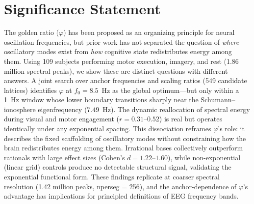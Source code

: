 \documentclass[11pt,a4paper]{article}
\newcommand{\phisym}{\varphi}
\newcommand{\fzero}{f_0}
\begin{document}
\begin{abstract}
Beyond $\phisym$'s individual dominance, irrational bases ($\phisym$, $\sqrt{2}$, $e$, $\pi$) collectively outperform rational bases (1.4, 3/2, 1.7, 1.8, 2) across an ``irrational advantage window'' ($\fzero = 7.1$--$9.4$~Hz, bootstrap $p < 0.001$, Cohen's $d = 1.22$--$1.60$) that entirely contains the Schumann Resonance variation range. Non-exponential controls (linear grids $\fzero + n \cdot k$) fail to detect any systematic structure (mean $\text{SS} \approx 0$), validating exponential scaling as the correct functional form. Cross-resolution replication (nperseg = 256, 1.42 million peaks) confirms all structural findings with larger class-level effect sizes.

The $\phisym$-lattice thus describes the fixed scaffolding of available oscillatory modes, while cognitive state modulates energy allocation across modes through a mechanism indifferent to the specific spacing between them. Within the anchor window, $\phisym$ is the uniquely best-fitting scaling ratio; the qualification is anchor-dependence, not base ambiguity.
\end{abstract}

\section*{Significance Statement}
The golden ratio ($\phisym$) has been proposed as an organizing principle for neural oscillation frequencies, but prior work has not separated the question of \emph{where} oscillatory modes exist from \emph{how} cognitive state redistributes energy among them. Using 109 subjects performing motor execution, imagery, and rest (1.86 million spectral peaks), we show these are distinct questions with different answers. A joint search over anchor frequencies and scaling ratios (549 candidate lattices) identifies $\phisym$ at $\fzero = 8.5$~Hz as the global optimum---but only within a 1~Hz window whose lower boundary transitions sharply near the Schumann--ionosphere eigenfrequency ($7.49$~Hz). The dynamic reallocation of spectral energy during visual and motor engagement ($r = 0.31$--$0.52$) is real but operates identically under any exponential spacing. This dissociation reframes $\phisym$'s role: it describes the fixed scaffolding of oscillatory modes without constraining how the brain redistributes energy among them. Irrational bases collectively outperform rationals with large effect sizes (Cohen's $d = 1.22$--$1.60$), while non-exponential (linear grid) controls produce no detectable structural signal, validating the exponential functional form. These findings replicate at coarser spectral resolution (1.42 million peaks, nperseg = 256), and the anchor-dependence of $\phisym$'s advantage has implications for principled definitions of EEG frequency bands.
\end{document}
